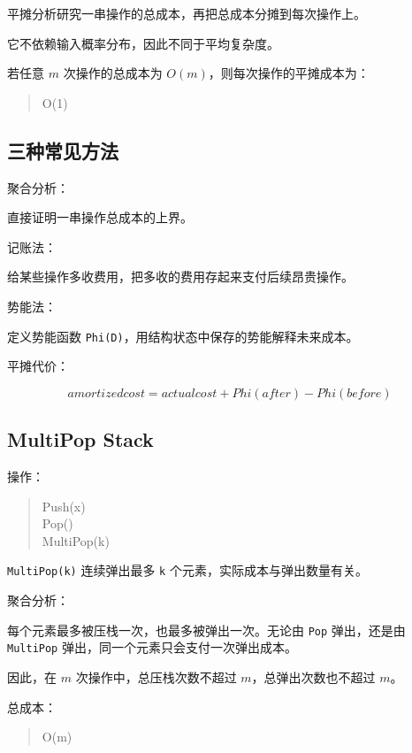 \documentclass[UTF8,zihao=-4]{ctexart}
\begin{document}
平摊分析研究一串操作的总成本，再把总成本分摊到每次操作上。

它不依赖输入概率分布，因此不同于平均复杂度。

若任意 $m$ 次操作的总成本为 $O(m)$，则每次操作的平摊成本为：

\begin{quote}
\small\ttfamily\raggedright
\relax O(1)\\
\end{quote}

\subsection*{三种常见方法}

聚合分析：

直接证明一串操作总成本的上界。

记账法：

给某些操作多收费用，把多收的费用存起来支付后续昂贵操作。

势能法：

定义势能函数 \texttt{Phi(D)}，用结构状态中保存的势能解释未来成本。

平摊代价：

\[amortized cost = actual cost + Phi(after) - Phi(before)\]

\subsection*{MultiPop Stack}

操作：

\begin{quote}
\small\ttfamily\raggedright
\relax Push(x)\\
\relax Pop()\\
\relax MultiPop(k)\\
\end{quote}

\texttt{MultiPop(k)} 连续弹出最多 \texttt{k} 个元素，实际成本与弹出数量有关。

聚合分析：

每个元素最多被压栈一次，也最多被弹出一次。无论由 \texttt{Pop} 弹出，还是由 \texttt{MultiPop} 弹出，同一个元素只会支付一次弹出成本。

因此，在 $m$ 次操作中，总压栈次数不超过 $m$，总弹出次数也不超过 $m$。

总成本：

\begin{quote}
\small\ttfamily\raggedright
\relax O(m)\\
\end{quote}
\end{document}
